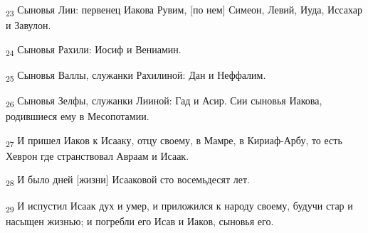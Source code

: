 \begin{tcolorbox}
\textsubscript{23} Сыновья Лии: первенец Иакова Рувим, [по нем] Симеон, Левий, Иуда, Иссахар и Завулон.
\end{tcolorbox}
\begin{tcolorbox}
\textsubscript{24} Сыновья Рахили: Иосиф и Вениамин.
\end{tcolorbox}
\begin{tcolorbox}
\textsubscript{25} Сыновья Валлы, служанки Рахилиной: Дан и Неффалим.
\end{tcolorbox}
\begin{tcolorbox}
\textsubscript{26} Сыновья Зелфы, служанки Лииной: Гад и Асир. Сии сыновья Иакова, родившиеся ему в Месопотамии.
\end{tcolorbox}
\begin{tcolorbox}
\textsubscript{27} И пришел Иаков к Исааку, отцу своему, в Мамре, в Кириаф-Арбу, то есть Хеврон где странствовал Авраам и Исаак.
\end{tcolorbox}
\begin{tcolorbox}
\textsubscript{28} И было дней [жизни] Исааковой сто восемьдесят лет.
\end{tcolorbox}
\begin{tcolorbox}
\textsubscript{29} И испустил Исаак дух и умер, и приложился к народу своему, будучи стар и насыщен жизнью; и погребли его Исав и Иаков, сыновья его.
\end{tcolorbox}
